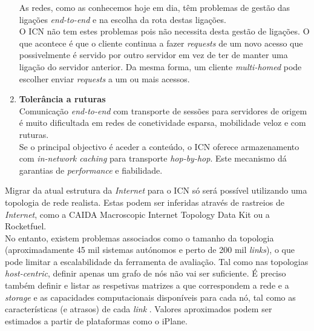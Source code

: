 \documentclass[conference]{IEEEtran}
\begin{document}
\begin{enumerate}
As redes, como as conhecemos hoje em dia, t\^{e}m problemas de gest\~{a}o das liga\c{c}\~{o}es \textit{end-to-end} e na escolha da rota destas liga\c{c}\~{o}es.\\

O ICN n\~{a}o tem estes problemas pois n\~{a}o necessita desta gest\~{a}o de liga\c{c}\~{o}es. O que acontece \'{e} que o cliente continua a fazer \textit{requests} de um novo acesso que possivelmente \'{e} servido por outro servidor em vez de ter de manter uma liga\c{c}\~{a}o do servidor anterior. Da mesma forma, um cliente \textit{multi-homed} pode escolher enviar \textit{requests} a um ou mais acessos.\\

\item \textbf{Toler\^{a}ncia a ruturas}\\

Comunica\c{c}\~{a}o \textit{end-to-end} com transporte de sess\~{o}es para servidores de origem \'{e} muito dificultada em redes de conetividade esparsa, mobilidade veloz e com ruturas.\\

Se o principal objectivo \'{e} aceder a conte\'{u}do, o ICN oferece armazenamento com \textit{in-network caching} para transporte \textit{hop-by-hop}. Este mecanismo d\'{a} garantias de \textit{performance} e fiabilidade.\\

\end{enumerate} 

Migrar da atual estrutura da \textit{Internet} para o ICN s\'{o} ser\'{a} poss\'{i}vel utilizando uma topologia de rede realista. Estas podem ser inferidas atrav\'{e}s de rastreios de \textit{Internet}, como a CAIDA Macroscopic Internet Topology Data Kit 
ou a Rocketfuel.\\
 

No entanto, existem problemas associados como o tamanho da topologia (aproximadamente 45 mil sistemas aut\'{o}nomos e perto de 200 mil \textit{links}), o que pode limitar a escalabilidade da ferramenta de avalia\c{c}\~{a}o. Tal como nas topologias \textit{host-centric}, definir apenas um grafo de n\'{o}s n\~{a}o vai ser suficiente. É preciso tamb\'{e}m definir e listar as respetivas matrizes a que correspondem a rede e a \textit{storage} e as capacidades computacionais dispon\'{i}veis para cada n\'{o}, tal como as caracter\'{i}sticas (e atrasos) de cada \textit{link}%
. Valores aproximados podem ser estimados a partir de plataformas como o iPlane. %
\\
\end{document}
